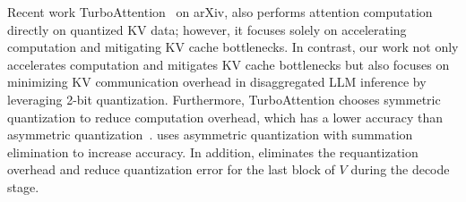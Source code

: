 
Recent work TurboAttention~\cite{turboattention} on arXiv, also performs attention computation directly on quantized KV data; however, it focuses solely on accelerating computation and mitigating KV cache bottlenecks. In contrast, our work not only accelerates computation and mitigates KV cache bottlenecks but also focuses on minimizing KV communication overhead in disaggregated LLM inference by leveraging 2-bit quantization.
Furthermore, TurboAttention chooses symmetric quantization to reduce computation overhead, which has a lower accuracy than asymmetric quantization~\cite{turboattention}. \sys uses asymmetric quantization with summation elimination to increase accuracy. In addition, \sys eliminates the requantization overhead and reduce quantization error for the last block of $V$ during the decode stage.




